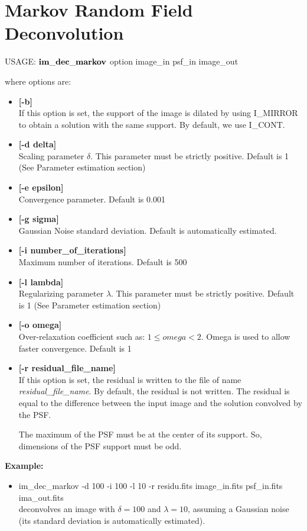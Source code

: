 \section*{Markov Random Field Deconvolution}

\begin{center}
 USAGE: ${\bf im\_dec\_markov}$ option image\_in psf\_in image\_out
\end{center}
where options are: 
\begin{itemize}
\item {\bf [-b]} \\
If this option is set, the support of the image is dilated by using I\_MIRROR to
obtain a solution with the same support. By default, we use I\_CONT.
\item {\bf [-d delta]} \\
Scaling parameter $\delta$. This parameter must be strictly positive. 
Default is 1 (See Parameter estimation section)
\item {\bf [-e epsilon]} \\
Convergence parameter. Default is 0.001
\item {\bf [-g sigma]} \\
Gaussian Noise standard deviation. Default is automatically estimated.
\item {\bf [-i number\_of\_iterations]} \\
Maximum number of iterations. Default is 500
\item {\bf [-l lambda]} \\
Regularizing parameter $\lambda$. This parameter must be strictly positive. 
Default is 1 (See Parameter estimation section)
\item {\bf [-o omega]} \\
Over-relaxation coefficient such as: $1\leq omega<2$. Omega is used to allow faster 
convergence. Default is 1 
\item {\bf [-r residual\_file\_name]} \\
If this option is set, the residual is written to 
the file of name {\em residual\_file\_name}. By default, the
residual is not written. The residual is equal to the difference between
the input image and the solution convolved by the PSF.

The maximum of the PSF must be at the center of its support.
So, dimensions of the PSF support must be odd.
\end{itemize}
\noindent

{\bf Example:}
\begin{itemize}
\item im\_dec\_markov -d 100 -i 100 -l 10 -r residu.fits 
image\_in.fits psf\_in.fits ima\_out.fits \\
deconvolves an image with $\delta=100$ and $\lambda=10$, assuming
a Gaussian noise (its standard deviation is automatically estimated).
\end{itemize}

